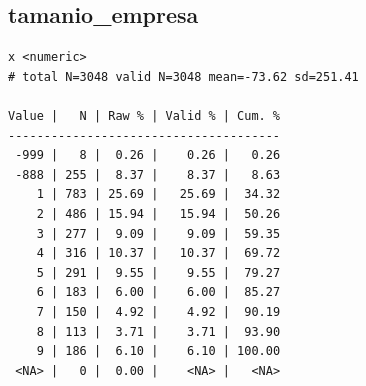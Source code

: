 \documentclass[
  letterpaper,
  DIV=11,
  numbers=noendperiod]{scrreprt}
\newenvironment{Shaded}{\begin{snugshade}}{\end{snugshade}}
\newcommand{\FunctionTok}[1]{\textcolor[rgb]{0.28,0.35,0.67}{#1}}
\newcommand{\NormalTok}[1]{\textcolor[rgb]{0.00,0.23,0.31}{#1}}
\newcommand{\SpecialCharTok}[1]{\textcolor[rgb]{0.37,0.37,0.37}{#1}}
\begin{document}
\hypertarget{tamanio_empresa}{%
\subsection{tamanio\_empresa}\label{tamanio_empresa}}

\begin{Shaded}
\end{Shaded}

\begin{verbatim}
x <numeric> 
# total N=3048 valid N=3048 mean=-73.62 sd=251.41

Value |   N | Raw % | Valid % | Cum. %
--------------------------------------
 -999 |   8 |  0.26 |    0.26 |   0.26
 -888 | 255 |  8.37 |    8.37 |   8.63
    1 | 783 | 25.69 |   25.69 |  34.32
    2 | 486 | 15.94 |   15.94 |  50.26
    3 | 277 |  9.09 |    9.09 |  59.35
    4 | 316 | 10.37 |   10.37 |  69.72
    5 | 291 |  9.55 |    9.55 |  79.27
    6 | 183 |  6.00 |    6.00 |  85.27
    7 | 150 |  4.92 |    4.92 |  90.19
    8 | 113 |  3.71 |    3.71 |  93.90
    9 | 186 |  6.10 |    6.10 | 100.00
 <NA> |   0 |  0.00 |    <NA> |   <NA>
\end{verbatim}
\end{document}
